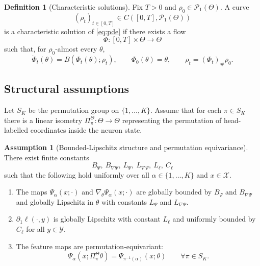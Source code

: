 \documentclass[11pt]{article}
\theoremstyle{definition}
\newtheorem{definition}[theorem]{Definition}
\newtheorem{assumption}[theorem]{Assumption}
\newcommand{\PP}{\mathcal{P}}
\begin{document}
\begin{definition}[Characteristic solutions]
Fix $T>0$ and $\rho_0\in\PP_1(\Theta)$. A curve
\[
  (\rho_t)_{t\in[0,T]}\in C([0,T],\PP_1(\Theta))
\]
is a characteristic solution of \cref{eq:pde} if there exists a flow
\[
  \Phi:[0,T]\times\Theta\to\Theta
\]
such that, for $\rho_0$-almost every $\theta$,
\[
  \dot\Phi_t(\theta)=B(\Phi_t(\theta);\rho_t),
  \qquad
  \Phi_0(\theta)=\theta,
  \qquad
  \rho_t=(\Phi_t)_\#\rho_0.
\]
\end{definition}

\subsection{Structural assumptions}

Let $S_K$ be the permutation group on $\{1,\dots,K\}$. Assume that for each
$\pi\in S_K$ there is a linear isometry $\Pi_\pi^\Theta:\Theta\to\Theta$
representing the permutation of head-labelled coordinates inside the neuron
state.

\begin{assumption}[Bounded-Lipschitz structure and permutation equivariance]
\label{ass:main}
There exist finite constants
\[
  B_\Psi,\ B_{\nabla\Psi},\ L_\Psi,\ L_{\nabla\Psi},\ L_\ell,\ C_\ell
\]
such that the following hold uniformly over all $\alpha\in\{1,\dots,K\}$ and
$x\in\mathcal X$.
\begin{enumerate}[label=(\roman*),leftmargin=2em]
  \item The maps $\Psi_\alpha(x;\cdot)$ and $\nabla_\theta\Psi_\alpha(x;\cdot)$
  are globally bounded by $B_\Psi$ and $B_{\nabla\Psi}$ and globally Lipschitz
  in $\theta$ with constants $L_\Psi$ and $L_{\nabla\Psi}$.
  \item $\partial_1\ell(\cdot,y)$ is globally Lipschitz with constant $L_\ell$
  and uniformly bounded by $C_\ell$ for all $y\in\mathcal Y$.
  \item The feature maps are permutation-equivariant:
  \begin{equation}
    \Psi_\alpha(x;\Pi_\pi^\Theta\theta)
    =
    \Psi_{\pi^{-1}(\alpha)}(x;\theta)
    \qquad
    \forall \pi\in S_K.
    \label{eq:equiv}
  \end{equation}
\end{enumerate}
\end{assumption}
\end{document}

